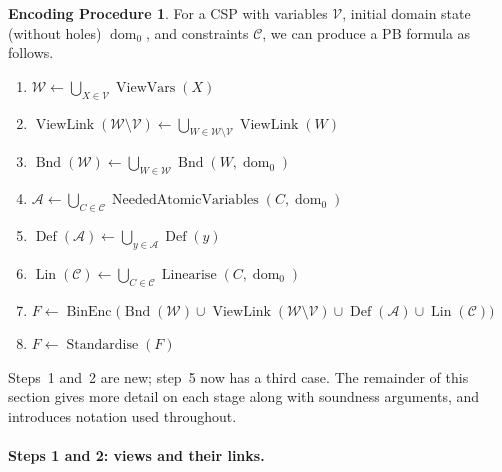 \documentclass[11pt,a4paper]{article}
\theoremstyle{plain}
\theoremstyle{definition}
\newtheorem{procedureT}{Encoding Procedure}
\theoremstyle{remark}
\newcommand{\fname}[1]{\ensuremath{\operatorname{#1}}}
\newcommand{\BinEnc}{\fname{BinEnc}}
\newcommand{\Bnd}{\fname{Bnd}}
\newcommand{\Def}{\fname{Def}}
\newcommand{\Lin}{\fname{Lin}}
\newcommand{\ViewVars}{\fname{ViewVars}}
\newcommand{\ViewLink}{\fname{ViewLink}}
\newcommand{\dm}{\fname{dom}}
\newcommand{\Standardise}{\fname{Standardise}}
\newcommand{\Linearise}{\fname{Linearise}}
\newcommand{\NeededAtomicVariables}{\fname{NeededAtomicVariables}}
\begin{document}
\begin{procedureT}
\label{proc:encoding}
For a CSP with variables $\mathcal V$, initial domain state (without holes)
$\dm_0$, and constraints $\mathcal C$, we can produce a PB formula as follows.
\begin{enumerate}[label=\arabic*:,leftmargin=2.6em,itemsep=1pt]
  \item $\mathcal W \leftarrow \bigcup_{X\in\mathcal V}\ViewVars(X)$
  \item $\ViewLink(\mathcal W\setminus\mathcal V) \leftarrow
        \bigcup_{W\in\mathcal W\setminus\mathcal V}\ViewLink(W)$
  \item $\Bnd(\mathcal W) \leftarrow \bigcup_{W\in\mathcal W}\Bnd(W,\dm_0)$
  \item $\mathcal A \leftarrow \bigcup_{C\in\mathcal C}
        \NeededAtomicVariables(C,\dm_0)$
  \item $\Def(\mathcal A) \leftarrow \bigcup_{y\in\mathcal A}\Def(y)$
  \item $\Lin(\mathcal C) \leftarrow \bigcup_{C\in\mathcal C}\Linearise(C,\dm_0)$
  \item $F \leftarrow \BinEnc\bigl(\Bnd(\mathcal W)\cup\ViewLink(\mathcal W\setminus\mathcal V)
        \cup\Def(\mathcal A)\cup\Lin(\mathcal C)\bigr)$
  \item $F \leftarrow \Standardise(F)$
\end{enumerate}
\end{procedureT}

Steps~1 and~2 are new; step~5 now has a third case.  The remainder of this
section gives more detail on each stage along with soundness arguments, and
introduces notation used throughout.

\paragraph{Steps 1 and 2: views and their links.}
\end{document}
